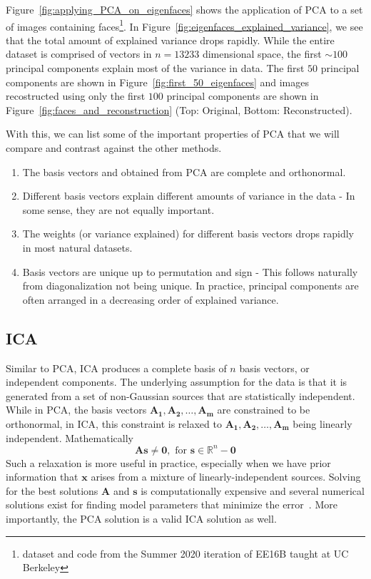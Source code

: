 \documentclass[10pt,onecolumn]{article}
\begin{document}
    Figure~\ref{fig:applying_PCA_on_eigenfaces} shows the application of \ac{PCA} to a set of images containing faces\footnote{dataset and code from the Summer 2020 iteration of EE16B taught at UC Berkeley}.
    In Figure~\ref{fig:eigenfaces_explained_variance}, we see that the total amount of explained variance drops rapidly.
    While the entire dataset is comprised of vectors in $n=13233$ dimensional space, the first $\sim100$ principal components explain most of the variance in data.
    The first $50$ principal components are shown in Figure~\ref{fig:first_50_eigenfaces} and images recostructed using only the first $100$ principal components are shown in Figure~\ref{fig:faces_and_reconstruction} (Top: Original, Bottom: Reconstructed).

    With this, we can list some of the important properties of \ac{PCA} that we will compare and contrast against the other methods.
    \begin{enumerate}
        \item The basis vectors and obtained from \ac{PCA} are complete and orthonormal.
        \item Different basis vectors explain different amounts of variance in the data - In some sense, they are not equally important.
        \item The weights (or variance explained) for different basis vectors drops rapidly in most natural datasets.
        \item Basis vectors are unique up to permutation and sign - This follows naturally from diagonalization not being unique.
            In practice, principal components are often arranged in a decreasing order of explained variance.
    \end{enumerate}

    \subsection{\ac{ICA}}
    \label{sec:def_ica}
    Similar to \ac{PCA}, \ac{ICA} produces a complete basis of $n$ basis vectors, or independent components.
    The underlying assumption for the data is that it is generated from a set of non-Gaussian sources that are statistically independent.
    While in \ac{PCA}, the basis vectors $\mathbf{A_1},\mathbf{A_2},\dots,\mathbf{A_m}$ are constrained to be orthonormal, in \ac{ICA}, this constraint is relaxed to $\mathbf{A_1},\mathbf{A_2},\dots,\mathbf{A_m}$ being linearly independent.
    Mathematically
    \begin{equation}
        \mathbf{A}\mathbf{s}\neq \mathbf{0}, \mbox{ for } \mathbf{s}\in\mathbb{R}^n-\mathbf{0}
        \label{eqn:defining_independence}
    \end{equation}
    Such a relaxation is more useful in practice, especially when we have prior information that $\mathbf{x}$ arises from a mixture of linearly-independent sources.
    Solving for the best solutions $\mathbf{A}$ and $\mathbf{s}$ is computationally expensive and several numerical solutions exist for finding model parameters that minimize the error~\cite{oja2006fastica,hyvarinen1999fast}.
    More importantly, the \ac{PCA} solution is a valid \ac{ICA} solution as well.
\end{document}
